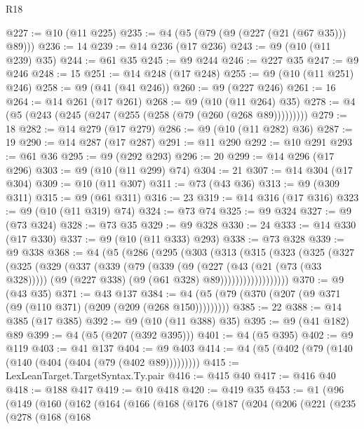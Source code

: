 \begin{lexlean}{R18}
\begin{coremodule}
@227 := @10 (@11 @225)
@235 := @4 (@5 (@79 (@9 (@227 (@21 (@67 @35))) @89)))
@236 := 14
@239 := @14 @236 (@17 @236)
@243 := @9 (@10 (@11 @239) @35)
@244 := @61 @35
@245 := @9 @244
@246 := @227 @35
@247 := @9 @246
@248 := 15
@251 := @14 @248 (@17 @248)
@255 := @9 (@10 (@11 @251) @246)
@258 := @9 (@41 (@41 @246))
@260 := @9 (@227 @246)
@261 := 16
@264 := @14 @261 (@17 @261)
@268 := @9 (@10 (@11 @264) @35)
@278 := @4 (@5 (@243 (@245 (@247 (@255 (@258 (@79 (@260 (@268 @89)))))))))
@279 := 18
@282 := @14 @279 (@17 @279)
@286 := @9 (@10 (@11 @282) @36)
@287 := 19
@290 := @14 @287 (@17 @287)
@291 := @11 @290
@292 := @10 @291
@293 := @61 @36
@295 := @9 (@292 @293)
@296 := 20
@299 := @14 @296 (@17 @296)
@303 := @9 (@10 (@11 @299) @74)
@304 := 21
@307 := @14 @304 (@17 @304)
@309 := @10 (@11 @307)
@311 := @73 (@43 @36)
@313 := @9 (@309 @311)
@315 := @9 (@61 @311)
@316 := 23
@319 := @14 @316 (@17 @316)
@323 := @9 (@10 (@11 @319) @74)
@324 := @73 @74
@325 := @9 @324
@327 := @9 (@73 @324)
@328 := @73 @35
@329 := @9 @328
@330 := 24
@333 := @14 @330 (@17 @330)
@337 := @9 (@10 (@11 @333) @293)
@338 := @73 @328
@339 := @9 @338
@368 := @4
    (@5
      (@286
        (@295
          (@303
            (@313
              (@315
                (@323
                  (@325
                    (@327
                      (@325
                        (@329
                          (@337
                            (@339
                              (@79
                                (@339
                                  (@9
                                    (@227 (@43 (@21 (@73 (@33 @328)))))
                                    (@9 (@227 @338) (@9 (@61 @328) @89))))))))))))))))))
@370 := @9 (@43 @35)
@371 := @43 @137
@384 := @4 (@5 (@79 (@370 (@207 (@9 @371 (@9 (@110 @371) (@209 (@209 (@268 @150)))))))))
@385 := 22
@388 := @14 @385 (@17 @385)
@392 := @9 (@10 (@11 @388) @35)
@395 := @9 (@41 @182) @89
@399 := @4 (@5 (@207 (@392 @395)))
@401 := @4 (@5 @395)
@402 := @9 @119
@403 := @41 @137
@404 := @9 @403
@414 := @4 (@5 (@402 (@79 (@140 (@140 (@404 (@404 (@79 (@402 @89)))))))))
@415 := LexLeanTarget.TargetSyntax.Ty.pair
@416 := @415 @40
@417 := @416 @40
@418 := @188 @417
@419 := @10 @418
@420 := @419 @35
@453 := @1
    (@96
      (@149
        (@160
          (@162
            (@164
              (@166
                (@168
                  (@176
                    (@187
                      (@204
                        (@206
                          (@221
                            (@235
                              (@278
                                (@168
                                  (@168

\end{coremodule}
\end{lexlean}
